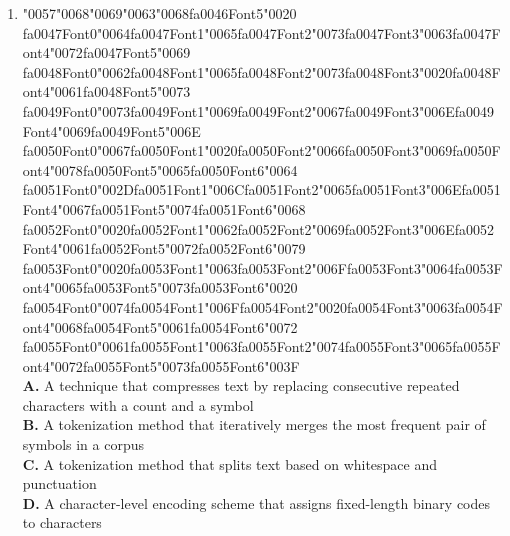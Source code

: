 \documentclass[11pt]{article}
\begin{document}
\begin{enumerate}[label=Q\arabic*., leftmargin=*]
\item {\char"0057}{\char"0068}{\char"0069}{\char"0063}{\char"0068}{\csname fa0046Font5\endcsname\char"0020} {\csname fa0047Font0\endcsname\char"0064}{\csname fa0047Font1\endcsname\char"0065}{\csname fa0047Font2\endcsname\char"0073}{\csname fa0047Font3\endcsname\char"0063}{\csname fa0047Font4\endcsname\char"0072}{\csname fa0047Font5\endcsname\char"0069} {\csname fa0048Font0\endcsname\char"0062}{\csname fa0048Font1\endcsname\char"0065}{\csname fa0048Font2\endcsname\char"0073}{\csname fa0048Font3\endcsname\char"0020}{\csname fa0048Font4\endcsname\char"0061}{\csname fa0048Font5\endcsname\char"0073} {\csname fa0049Font0\endcsname\char"0073}{\csname fa0049Font1\endcsname\char"0069}{\csname fa0049Font2\endcsname\char"0067}{\csname fa0049Font3\endcsname\char"006E}{\csname fa0049Font4\endcsname\char"0069}{\csname fa0049Font5\endcsname\char"006E} {\csname fa0050Font0\endcsname\char"0067}{\csname fa0050Font1\endcsname\char"0020}{\csname fa0050Font2\endcsname\char"0066}{\csname fa0050Font3\endcsname\char"0069}{\csname fa0050Font4\endcsname\char"0078}{\csname fa0050Font5\endcsname\char"0065}{\csname fa0050Font6\endcsname\char"0064} {\csname fa0051Font0\endcsname\char"002D}{\csname fa0051Font1\endcsname\char"006C}{\csname fa0051Font2\endcsname\char"0065}{\csname fa0051Font3\endcsname\char"006E}{\csname fa0051Font4\endcsname\char"0067}{\csname fa0051Font5\endcsname\char"0074}{\csname fa0051Font6\endcsname\char"0068} {\csname fa0052Font0\endcsname\char"0020}{\csname fa0052Font1\endcsname\char"0062}{\csname fa0052Font2\endcsname\char"0069}{\csname fa0052Font3\endcsname\char"006E}{\csname fa0052Font4\endcsname\char"0061}{\csname fa0052Font5\endcsname\char"0072}{\csname fa0052Font6\endcsname\char"0079} {\csname fa0053Font0\endcsname\char"0020}{\csname fa0053Font1\endcsname\char"0063}{\csname fa0053Font2\endcsname\char"006F}{\csname fa0053Font3\endcsname\char"0064}{\csname fa0053Font4\endcsname\char"0065}{\csname fa0053Font5\endcsname\char"0073}{\csname fa0053Font6\endcsname\char"0020} {\csname fa0054Font0\endcsname\char"0074}{\csname fa0054Font1\endcsname\char"006F}{\csname fa0054Font2\endcsname\char"0020}{\csname fa0054Font3\endcsname\char"0063}{\csname fa0054Font4\endcsname\char"0068}{\csname fa0054Font5\endcsname\char"0061}{\csname fa0054Font6\endcsname\char"0072} {\csname fa0055Font0\endcsname\char"0061}{\csname fa0055Font1\endcsname\char"0063}{\csname fa0055Font2\endcsname\char"0074}{\csname fa0055Font3\endcsname\char"0065}{\csname fa0055Font4\endcsname\char"0072}{\csname fa0055Font5\endcsname\char"0073}{\csname fa0055Font6\endcsname\char"003F}\\[0.25em]
\textbf{A.} A technique that compresses text by replacing consecutive repeated characters with a count and a symbol\\
\textbf{B.} A tokenization method that iteratively merges the most frequent pair of symbols in a corpus\\
\textbf{C.} A tokenization method that splits text based on whitespace and punctuation\\
\textbf{D.} A character-level encoding scheme that assigns fixed-length binary codes to characters


\end{enumerate}
\end{document}
